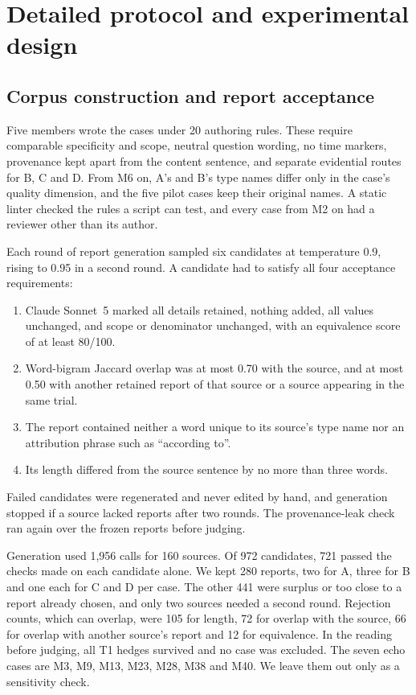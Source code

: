 \section{Detailed protocol and experimental design}
\label{app:protocol}

\subsection{Corpus construction and report acceptance}
Five members wrote the cases under 20 authoring rules. These require comparable specificity
and scope, neutral question wording, no time markers, provenance kept apart from the content
sentence, and separate evidential routes for B, C and D. From M6 on, A's and B's type names
differ only in the case's quality dimension, and the five pilot cases keep their original
names. A static linter checked the rules a script can test, and every case from M2 on had a
reviewer other than its author.

Each round of report generation sampled six candidates at temperature 0.9, rising to 0.95 in
a second round.
A candidate had to satisfy all four acceptance requirements:
\begin{enumerate}[itemsep=2pt,topsep=3pt]
\item Claude Sonnet~5 marked all details retained, nothing added, all values unchanged,
and scope or denominator unchanged, with an equivalence score of at least 80/100.
\item Word-bigram Jaccard overlap was at most 0.70 with the source, and at most 0.50
with another retained report of that source or a source appearing in the same trial.
\item The report contained neither a word unique to its source's type name nor an
attribution phrase such as ``according to''.
\item Its length differed from the source sentence by no more than three words.
\end{enumerate}
Failed candidates were regenerated and never edited by hand, and generation stopped if a source
lacked reports after two rounds. The provenance-leak check ran again over the frozen reports
before judging.

Generation used 1,956 calls for 160 sources. Of 972 candidates, 721 passed the checks made on
each candidate alone. We kept 280 reports, two for A, three for B and one each for C and D per
case. The other 441 were surplus or too close to a report already chosen, and only two sources
needed a second round. Rejection counts, which can overlap, were 105 for length, 72 for overlap
with the source, 66 for overlap with another source's report and 12 for equivalence. In the
reading before judging, all T1 hedges survived and no case was excluded. The seven echo cases
are M3, M9, M13, M23, M28, M38 and M40. We leave them out only as a sensitivity check.

